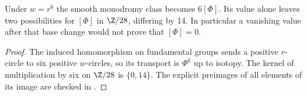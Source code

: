 \begin{proposition}\label{push:src:C.3.4}
Under $w=r^6$ the smooth monodromy class becomes $6[\Phi]$.
Its value alone leaves two possibilities for $[\Phi]$ in $\Z/28$,
differing by 14. In particular a vanishing value after that base
change would not prove that $[\Phi]=0$.
\end{proposition}
\begin{proof}
The induced homomorphism on fundamental groups sends a positive
$r$-circle to six positive $w$-circles, so its transport is
$\Phi^6$ up to isotopy. The kernel of multiplication by six on
$\Z/28$ is $\{0,14\}$. The explicit preimages of all elements
of its image are checked in .
\end{proof}

